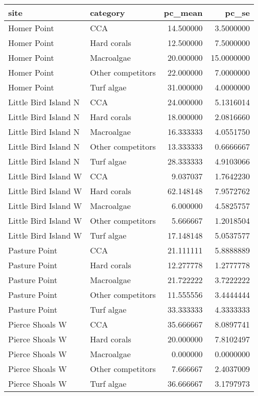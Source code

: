 \documentclass[
]{article}
\begin{document}
\begin{longtable}[]{@{}llrr@{}}
\toprule()
site & category & pc\_mean & pc\_se \\
\midrule()
\endhead
Homer Point & CCA & 14.500000 & 3.5000000 \\
Homer Point & Hard corals & 12.500000 & 7.5000000 \\
Homer Point & Macroalgae & 20.000000 & 15.0000000 \\
Homer Point & Other competitors & 22.000000 & 7.0000000 \\
Homer Point & Turf algae & 31.000000 & 4.0000000 \\
Little Bird Island N & CCA & 24.000000 & 5.1316014 \\
Little Bird Island N & Hard corals & 18.000000 & 2.0816660 \\
Little Bird Island N & Macroalgae & 16.333333 & 4.0551750 \\
Little Bird Island N & Other competitors & 13.333333 & 0.6666667 \\
Little Bird Island N & Turf algae & 28.333333 & 4.9103066 \\
Little Bird Island W & CCA & 9.037037 & 1.7642230 \\
Little Bird Island W & Hard corals & 62.148148 & 7.9572762 \\
Little Bird Island W & Macroalgae & 6.000000 & 4.5825757 \\
Little Bird Island W & Other competitors & 5.666667 & 1.2018504 \\
Little Bird Island W & Turf algae & 17.148148 & 5.0537577 \\
Pasture Point & CCA & 21.111111 & 5.8888889 \\
Pasture Point & Hard corals & 12.277778 & 1.2777778 \\
Pasture Point & Macroalgae & 21.722222 & 3.7222222 \\
Pasture Point & Other competitors & 11.555556 & 3.4444444 \\
Pasture Point & Turf algae & 33.333333 & 4.3333333 \\
Pierce Shoals W & CCA & 35.666667 & 8.0897741 \\
Pierce Shoals W & Hard corals & 20.000000 & 7.8102497 \\
Pierce Shoals W & Macroalgae & 0.000000 & 0.0000000 \\
Pierce Shoals W & Other competitors & 7.666667 & 2.4037009 \\
Pierce Shoals W & Turf algae & 36.666667 & 3.1797973 \\
\bottomrule()
\end{longtable}
\end{document}
